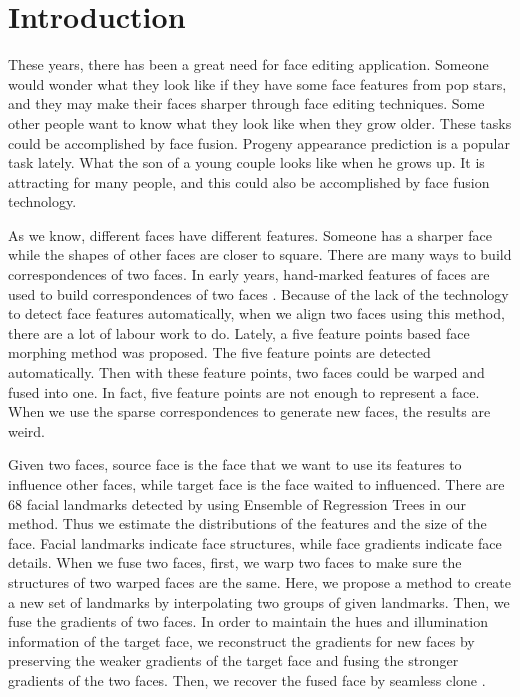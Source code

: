 \section{Introduction}





These years, there has been a great need for face editing application. 
Someone would wonder what they look like if they have some face features from pop stars, and they may make their faces sharper through face editing techniques. 
Some other people want to know what they look like when they grow older. 
These tasks could be accomplished by face fusion. 
Progeny appearance prediction is a popular task lately. What the son of a young couple looks like when he grows up. It is attracting for many people, and this could also be accomplished by face fusion technology.



As we know, different faces have different features. Someone has a sharper face while the shapes of other faces are closer to square. There are many ways to build correspondences of two faces. In early years, hand-marked features of faces are used to build correspondences of two faces \cite{fbim}. Because of the lack of the technology to detect face features automatically, when we align two faces using this method, there are a lot of labour work to do. Lately, a five feature points based face morphing method \cite{mhf} was proposed. The five feature points are detected automatically. Then with these feature points, two faces could be warped and fused into one. In fact, five feature points are not enough to represent a face. When we use the sparse correspondences to generate new faces, the results are weird.

Given two faces, source face is the face that we want to use its features to influence other faces, while target face is the face waited to influenced. There are 68 facial landmarks detected by using Ensemble of Regression Trees \cite{fld} in our method. Thus we estimate the distributions of the features and the size of the face. Facial landmarks indicate face structures, while face gradients indicate face details. When we fuse two faces, first, we warp two faces to make sure the structures of two warped faces are the same. Here, we propose a method  to create a new set of landmarks by interpolating two groups of given landmarks. Then, we fuse the gradients of two faces. In order to maintain the hues and illumination information of the target face, we reconstruct the gradients for new faces by preserving the weaker gradients of the target face and fusing the stronger gradients of the two faces. Then, we recover the fused face by seamless clone \cite{pie}.

